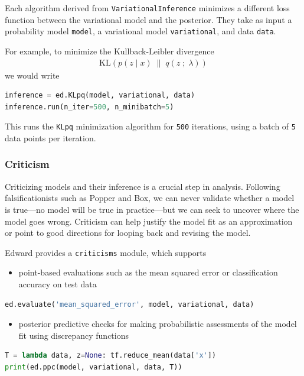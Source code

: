 Each algorithm derived from \texttt{VariationalInference} minimizes a
different loss function between the variational model and the
posterior. They take as input a probability model \texttt{model}, a
variational model \texttt{variational}, and data \texttt{data}.

For example, to minimize the Kullback-Leibler divergence
\begin{align*}
  \text{KL}(p(z \mid x) \;\|\; q(z \;;\; \lambda))
\end{align*}
we would write
\begin{lstlisting}[language=Python]
inference = ed.KLpq(model, variational, data)
inference.run(n_iter=500, n_minibatch=5)
\end{lstlisting}
This runs the \texttt{KLpq} minimization algorithm for \texttt{500} iterations,
using a batch of \texttt{5} data points per iteration.

\subsubsection{Criticism}\label{criticism}

Criticizing models and their inference is a crucial step in analysis.
Following
falsificationists such as Popper and Box, we can never validate
whether a model is true---no model will be true in practice---but we
can seek to uncover where the model goes wrong. Criticism can
help justify the model fit as an approximation or point to good directions
for looping back and revising the model.

Edward provides a \texttt{criticisms} module, which supports
\begin{itemize}
  \item point-based evaluations such as the mean squared error or
  classification accuracy on test data
\end{itemize}
\begin{lstlisting}[language=Python]
ed.evaluate('mean_squared_error', model, variational, data)
\end{lstlisting}
\begin{itemize}
  \item posterior predictive checks for making probabilistic
  assessments of the model fit using discrepancy functions
\end{itemize}
\begin{lstlisting}[language=Python]
T = lambda data, z=None: tf.reduce_mean(data['x'])
print(ed.ppc(model, variational, data, T))
\end{lstlisting}

